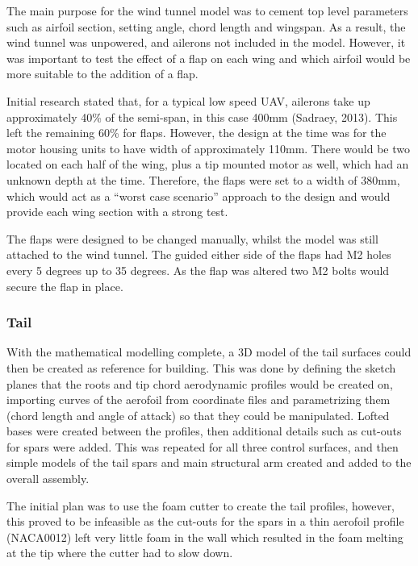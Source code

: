 \documentclass[../../main.tex]{subfiles}
\begin{document}
The main purpose for the wind tunnel model was to cement top level parameters such as airfoil section, setting angle, chord length and wingspan.
As a result, the wind tunnel was unpowered, and ailerons not included in the model.
However, it was important to test the effect of a flap on each wing and which airfoil would be more suitable to the addition of a flap. 

Initial research stated that, for a typical low speed UAV, ailerons take up approximately 40\% of the semi-span, in this case 400mm (Sadraey, 2013).
This left the remaining 60\% for flaps.
However, the design at the time was for the motor housing units to have width of approximately 110mm.
There would be two located on each half of the wing, plus a tip mounted motor as well, which had an unknown depth at the time.
Therefore, the flaps were set to a width of 380mm, which would act as a “worst case scenario” approach to the design and would provide each wing section with a strong test. 

The flaps were designed to be changed manually, whilst the model was still attached to the wind tunnel.
The guided either side of the flaps had M2 holes every 5 degrees up to 35 degrees.
As the flap was altered two M2 bolts would secure the flap in place. 


\subsubsection{Tail} \label{sec:design-process:interim-design-review:wind-tunnel-test:tail}

With the mathematical modelling complete, a 3D model of the tail surfaces could then be created as reference for building.
This was done by defining the sketch planes that the roots and tip chord aerodynamic profiles would be created on, importing curves of the aerofoil from coordinate files and parametrizing them (chord length and angle of attack) so that they could be manipulated.
Lofted bases were created between the profiles, then additional details such as cut-outs for spars were added.
This was repeated for all three control surfaces, and then simple models of the tail spars and main structural arm created and added to the overall assembly. 

The initial plan was to use the foam cutter to create the tail profiles, however, this proved to be infeasible as the cut-outs for the spars in a thin aerofoil profile (NACA0012) left very little foam in the wall which resulted in the foam melting at the tip where the cutter had to slow down.  
\end{document}
